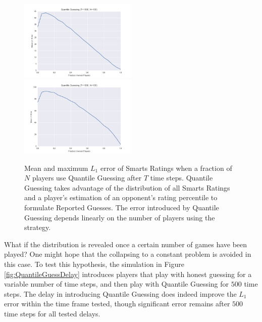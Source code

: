 \begin{figure}[h]
\centerline{%
\includegraphics[width=0.5\textwidth]{figures/robustness/Quantile_Guessing31.png}%
\includegraphics[width=0.5\textwidth] {figures/robustness/Quantile_Guessing32.png}%
}%
\caption{Mean and maximum $L_1$ error of Smarts Ratings when a fraction of $N$ players use Quantile Guessing after $T$ time steps. Quantile Guessing takes advantage of the distribution of all Smarts Ratings and a player's estimation of an opponent's rating percentile to formulate Reported Guesses. The error introduced by Quantile Guessing depends linearly on the number of players using the strategy.}
\label{fig:QuantileGuessFrac}
\end{figure}

What if the distribution is revealed once a certain number of games have been played? One might hope that the collapsing to a constant problem is avoided in this case. To test this hypothesis, the simulation in Figure \ref{fig:QuantileGuessDelay} introduces players that play with honest guessing for a variable number of time steps, and then play with Quantile Guessing for $500$ time steps. The delay in introducing Quantile Guessing does indeed improve the $L_1$ error within the time frame tested, though significant error remains after $500$ time steps for all tested delays. 

